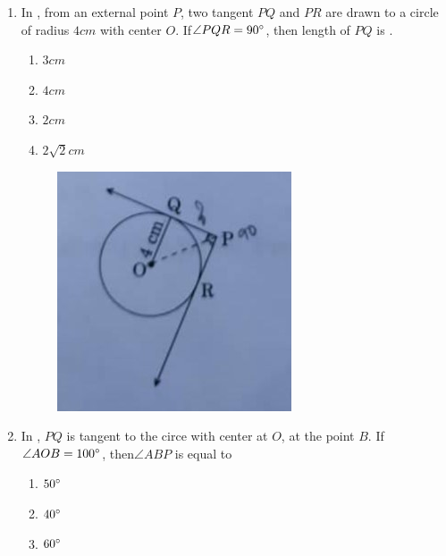 \begin{enumerate}
\item In , from an external point $P$, two tangent $PQ$ and $PR$ are drawn to a circle of radius $4cm$ with center $O$. If$\angle{PQR}=90\degree$, then length of $PQ$ is \underline {\hspace{4cm}}.
\begin{enumerate}[label=(\alph*)]
\item $3cm$ 
\item $4cm$
\item $2cm$
\item $2{\sqrt{2}}cm$ 
\end{enumerate}
\begin{figure}[H]
\centering
\includegraphics[width=\columnwidth]{figs/circ.jpg}
\caption{}
\label{fig:circ}
\end{figure}
\item In , $PQ$ is tangent to the circe with center at $O$, at the point $B$. If$\angle AOB=100\degree$, then$\angle ABP$ is equal to\newline
\begin{enumerate}[label=(\alph*)] 
\item $50\degree$ 
\item $40\degree$ 
\item $60\degree$ 

\end{enumerate}
\end{enumerate}
